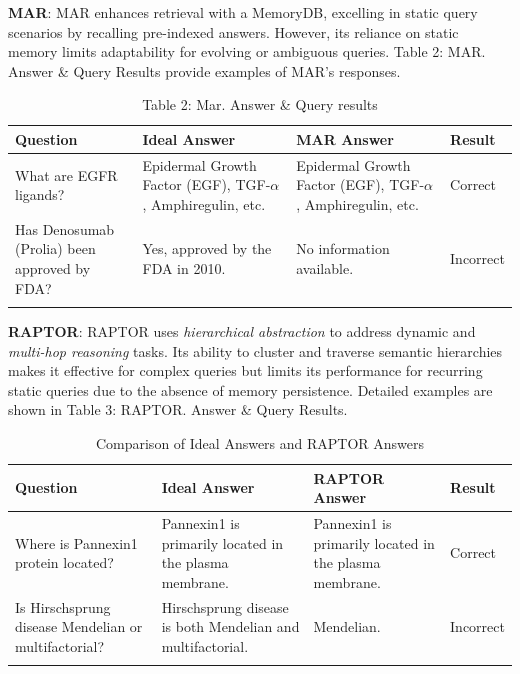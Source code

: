 \documentclass[pdflatex,sn-mathphys-num]{sn-jnl}%
\begin{document}
\textbf{MAR}: MAR enhances retrieval with a MemoryDB, excelling in static query scenarios by recalling pre-indexed answers. However, its reliance on static memory limits adaptability for evolving or ambiguous queries. Table 2: MAR. Answer \& Query Results provide examples of MAR’s responses.
\begin{table}[h]
\caption{Table 2: Mar. Answer \& Query results}\label{tab:mar_results}%
\begin{tabular}{@{}p{}p{}p{}p{}@{}}
\toprule
\textbf{Question} & \textbf{Ideal Answer} & \textbf{MAR Answer} & \textbf{Result} \\
\midrule
What are EGFR ligands? & Epidermal Growth Factor (EGF), TGF-$\alpha$, Amphiregulin, etc. & Epidermal Growth Factor (EGF), TGF-$\alpha$, Amphiregulin, etc. & Correct \\
Has Denosumab (Prolia) been approved by FDA? & Yes, approved by the FDA in 2010. & No information available. & Incorrect \\
\botrule
\end{tabular}
\end{table}

\textbf{RAPTOR}: RAPTOR uses \emph{hierarchical abstraction} to address dynamic and \emph{multi-hop reasoning} tasks. Its ability to cluster and traverse semantic hierarchies makes it effective for complex queries but limits its performance for recurring static queries due to the absence of memory persistence. Detailed examples are shown in Table 3: RAPTOR. Answer \& Query Results.
\begin{table}[h]
\caption{Comparison of Ideal Answers and RAPTOR Answers}\label{tab:raptor_results}%
\begin{tabular}{@{}p{}p{}p{}p{}@{}}
\toprule
\textbf{Question} & \textbf{Ideal Answer} & \textbf{RAPTOR Answer} & \textbf{Result} \\
\midrule
Where is Pannexin1 protein located? & Pannexin1 is primarily located in the plasma membrane. & Pannexin1 is primarily located in the plasma membrane. & Correct \\
Is Hirschsprung disease Mendelian or multifactorial? & Hirschsprung disease is both Mendelian and multifactorial. & Mendelian. & Incorrect \\
\botrule
\end{tabular}
\end{table}
\end{document}
